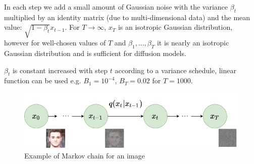 \documentclass[11pt,a4paper]{report}
\begin{document}
In each step we add a small amount of Gaussian noise with the variance $\beta_t$ multiplied by an identity matrix (due to multi-dimensional data) and the mean value: $\sqrt{1-\beta_t}x_{t-1}$. For $T\rightarrow\infty$, $x_T$ is an isotropic Gaussian distribution, however for well-chosen values of $T$ and $\beta_1,..., \beta_T$ it is nearly an isotropic Gaussian distribution and is sufficient for diffusion models.

$\beta_t$ is constant increased with step $t$ according to a variance schedule, linear function can be used e.g. $B_1=10^{-4}$, $B_T=0.02$ for $T=1000$. \cite{DDPM}

\begin{figure}[H]
	\centering
	\includegraphics[width=\textwidth]{images/forward-diffusion}
    \caption{Example of Markov chain for an image \cite{DDPM}}
\end{figure}
\end{document}

